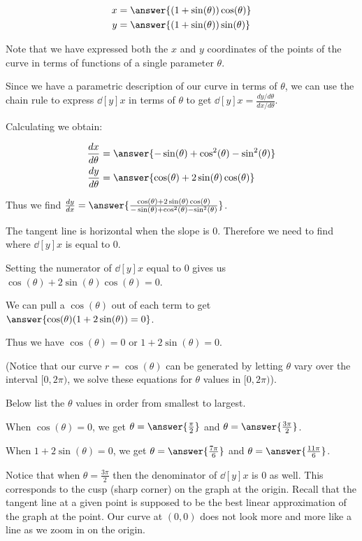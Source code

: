 \documentclass{ximera}
\begin{document}
\begin{exercise}
\begin{hint}
\begin{align*}
x&=\answer{(1+\sin(\theta))\cos(\theta)} \\
y&=\answer{(1+\sin(\theta))\sin(\theta) }
\end{align*}

Note that we have expressed both the $x$ and $y$ coordinates of the points of the curve in terms of functions of a single parameter $\theta$.

Since we have a parametric description of our curve in terms of $\theta$, 
we can use the chain rule to express $\dd[y]{x}$ in terms of $\theta$ to get $\dd[y]{x}=\frac{ dy/d\theta}{dx/d\theta}$.

Calculating we obtain:

\begin{align*}
\dd[x]{\theta}&=\answer{ -\sin(\theta)+\cos^2(\theta)-\sin^2(\theta)  } \\
\dd[y]{\theta}&=\answer{ \cos(\theta) + 2\sin(\theta)\cos(\theta)   }
\end{align*} 

Thus we find $\dd[y]{x}=\answer{\frac{ \cos(\theta) + 2\sin(\theta)\cos(\theta) }{-\sin(\theta)+\cos^2(\theta)-\sin^2(\theta) }}$. 

The tangent line is horizontal when the slope is $0$. Therefore we need to find where $\dd[y]{x}$ is equal to $0$.

Setting the numerator of $\dd[y]{x}$ equal to $0$ gives us $\cos(\theta) + 2\sin(\theta)\cos(\theta)=0$. 

We can pull a $\cos(\theta)$ out of each term to get $\answer{\cos(\theta)(1+2\sin(\theta))=0 }$. 

Thus we have $\cos(\theta)=0$ or $1+2\sin(\theta)=0$. 


(Notice that our curve $r=\cos(\theta)$ can be generated by letting $\theta$ vary over the interval $[0, 2\pi)$, we solve these equations for $\theta$ values in  $[0, 2\pi)$).

Below list the $\theta$ values in order from smallest to largest.  

When $\cos(\theta)=0$, we get $\theta=\answer{\frac{\pi}{2}}$ and $\theta=\answer{\frac{3\pi}{2}}$.  

When $1+2\sin(\theta)=0$, we get $\theta=\answer{ \frac{7\pi}{6}}$ and $\theta=\answer{\frac{11\pi}{6}}$.

Notice that when $\theta=\frac{3\pi}{2}$ then the denominator of $\dd[y]{x}$ is $0$ as well. This corresponds to the cusp (sharp corner) on the graph at the origin. Recall that the tangent line at a given point is supposed to be the best linear approximation of the graph at the point. Our curve at $(0,0)$ does not look more and more like a line as we zoom in on the origin. 


\end{hint}
\end{exercise}
\end{document}
